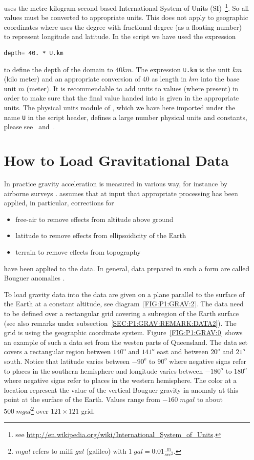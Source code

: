 \downunder uses the  metre-kilogram-second based 
International System of Units (SI)~\footnote{see \url{http://en.wikipedia.org/wiki/International_System_of_Units}.}. So all 
values must be converted to appropriate units. This does not apply to geographic coordinates where \downunder uses
the degree with fractional degree (as a floating number) to represent longitude and latitude. In the script we have used the expression
\begin{verbatim}
depth= 40. * U.km
\end{verbatim}
to define the depth of the domain to $40 km$. The expression \verb|U.km| is the unit $km$ (kilo meter) and an appropriate conversion 
of $40$ as length in $km$  into the base unit $m$ (meter). It is recommendable to add units to values (where present) 
in order to make sure that the final value handed into \downunder is given in the appropriate units. The physical units
module of \escript, which we have here imported under the name \verb|U| in the script header, defines a large number 
physical units and constants, please see~\cite{ESCRIPT} and~\cite{ESCRIPTONLINE}. 

\section{How to Load Gravitational Data}\label{SEC:P1:GRAV:DATA}
In practice gravity acceleration is measured in various way, for instance by airborne surveys . \downunder
assumes that at input that appropriate processing has been applied,  
in particular, corrections for  
\begin{itemize}
 \item free-air to remove effects from altitude above ground 
 \item latitude to remove effects from ellipsoidicity of the Earth  
 \item terrain to remove effects from topography  
\end{itemize}
have been applied to the data. In general, data prepared in such a form are called Bouguer anomalies . 

To load gravity data into  \downunder the data are given on a plane parallel to the surface of the Earth at a constant
altitude, see diagram~\ref{FIG:P1:GRAV:2}. The data need to be defined over a rectangular grid covering a subregion of 
the Earth surface (see also remarks under subsection~\ref{SEC:P1:GRAV:REMARK:DATA2}). 
The grid is using the geographic coordinate system. Figure~\ref{FIG:P1:GRAV:0} shows an example of such a data set
from the westen parts of Queensland. The data set covers a rectangular region between $140^o$ and $141^o$ east 
and between $20^o$ and $21^o$ south. Notice that latitude varies between $-90^o$ to $90^o$ where
negative signs refer to places in the southern hemisphere and
longitude varies between $-180^o$ to $180^o$ where
negative signs refer to places in the western hemisphere.
The color at a location represent the value of the vertical Bouguer gravity in  anomaly at this point at the surface of the Earth.
Values range from $-160  \;  mgal$ to about $500 \; mgal$\footnote{$mgal$ refers to milli $gal$ (galileo) with 
$1 \;  gal = 0.01 \frac{m}{sec^2}$.} over $121 \times 121$ grid.

